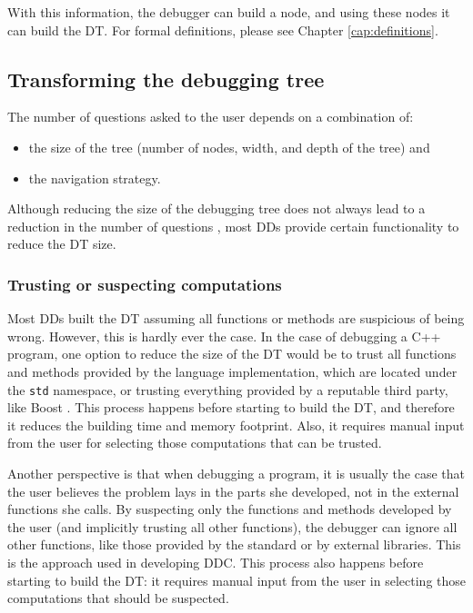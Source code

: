 With this information, the debugger can build a node, and using these nodes it can build the DT.
%
For formal definitions, please see Chapter \ref{cap:definitions}.

\subsection{Transforming the debugging tree}

The number of questions asked to the user depends on a combination of:
\begin{itemize}
    \item the size of the tree (number of nodes, width, and depth of the tree) and
    \item the navigation strategy.
\end{itemize}

Although reducing the size of the debugging tree does not always lead to a reduction in the number of questions \cite{LoopExpansionTreeCompression}, most DDs provide certain functionality to reduce the DT size.

\subsubsection{Trusting or suspecting computations}

Most DDs built the DT assuming all functions or methods are suspicious of being wrong.
However, this is hardly ever the case.
%
In the case of debugging a C++ program, one option to reduce the size of the DT would be to trust all functions and methods provided by the language implementation, which are located under the \verb|std| namespace, or trusting everything provided by a reputable third party, like Boost \cite{TheBoostLibraries}.
This process happens before starting to build the DT, and therefore it reduces the building time and memory footprint. Also, it requires manual input from the user for selecting those computations that can be trusted.

Another perspective is that when debugging a program, it is usually the case that the user believes the problem lays in the parts she developed, not in the external functions she calls.
%
By suspecting only the functions and methods developed by the user (and implicitly trusting all other functions), the debugger can ignore all other functions, like those provided by the standard or by external libraries.
This is the approach used in developing DDC.
This process also happens before starting to build the DT: it requires manual input from the user in selecting those computations that should be suspected.

